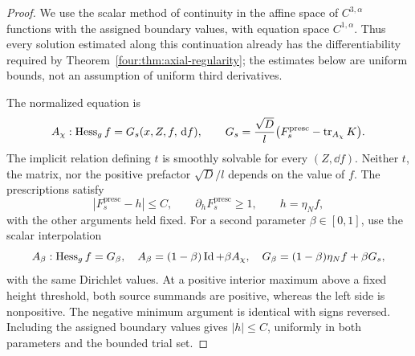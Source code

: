 \begin{proof}
We use the scalar method of continuity in the affine space of
$C^{3,\alpha}$ functions with the assigned boundary values, with equation
space $C^{1,\alpha}$. Thus every solution estimated along this
continuation already has the differentiability required by
Theorem~\ref{four:thm:axial-regularity}; the estimates below are uniform
bounds, not an assumption of uniform third derivatives.

The normalized equation is
\begin{equation}\label{four:ex:scalar-normalized}
 A_\chi:\operatorname{Hess}_g f=G_s(x,Z,f,\,\mathrm d f),\qquad
 G_s=\frac{\sqrt D}{l}
       \bigl(F_s^{\mathrm{presc}}-\operatorname{tr}_{A_\chi}K\bigr).
\end{equation}
The implicit relation defining $t$ is smoothly solvable for every
$(Z,\dd f)$.  Neither $t$, the matrix, nor the positive prefactor
$\sqrt D/l$ depends on the value of $f$.  The prescriptions satisfy
\[
 |F_s^{\mathrm{presc}}-h|\le C,
 \qquad \partial_h F_s^{\mathrm{presc}}\ge1,
 \qquad h=\eta_N f,
\]
with the other arguments held fixed.  For a second parameter
$\beta\in[0,1]$, use the scalar interpolation
\begin{equation}\label{four:ex:scalar-interpolation}
 A_\beta:\operatorname{Hess}_g f=G_\beta,
 \quad A_\beta=(1-\beta)\operatorname{Id}+\beta A_\chi,
 \quad G_\beta=(1-\beta)\eta_N f+\beta G_s,
\end{equation}
with the same Dirichlet values.  At a positive interior maximum above a
fixed height threshold, both source summands are positive, whereas the
left side is nonpositive.  The negative minimum argument is identical
with signs reversed.  Including the assigned boundary values gives
$|h|\le C$, uniformly in both parameters and the bounded trial set.


\end{proof}
